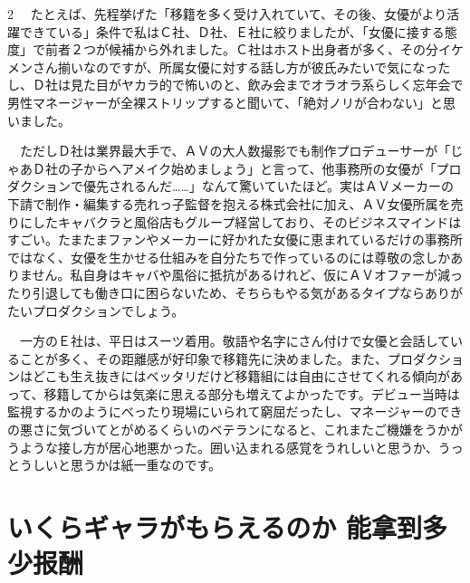\documentclass[12pt,UTF8]{ctexbook}
\begin{document}
\begin{paracol}{2}
　たとえば、先程挙げた「移籍を多く受け入れていて、その後、女優がより活躍できている」条件で私はＣ社、Ｄ社、Ｅ社に絞りましたが、「女優に接する態度」で前者２つが候補から外れました。Ｃ社はホスト出身者が多く、その分イケメンさん揃いなのですが、所属女優に対する話し方が彼氏みたいで気になったし、Ｄ社は見た目がヤカラ的で怖いのと、飲み会までオラオラ系らしく忘年会で男性マネージャーが全裸ストリップすると聞いて、「絶対ノリが合わない」と思いました。

　ただしＤ社は業界最大手で、ＡＶの大人数撮影でも制作プロデューサーが「じゃあＤ社の子からヘアメイク始めましょう」と言って、他事務所の女優が「プロダクションで優先されるんだ……」なんて驚いていたほど。実はＡＶメーカーの下請で制作・編集する売れっ子監督を抱える株式会社に加え、ＡＶ女優所属を売りにしたキャバクラと風俗店もグループ経営しており、そのビジネスマインドはすごい。たまたまファンやメーカーに好かれた女優に恵まれているだけの事務所ではなく、女優を生かせる仕組みを自分たちで作っているのには尊敬の念しかありません。私自身はキャバや風俗に抵抗があるけれど、仮にＡＶオファーが減ったり引退しても働き口に困らないため、そちらもやる気があるタイプならありがたいプロダクションでしょう。

　一方のＥ社は、平日はスーツ着用。敬語や名字にさん付けで女優と会話していることが多く、その距離感が好印象で移籍先に決めました。また、プロダクションはどこも生え抜きにはベッタリだけど移籍組には自由にさせてくれる傾向があって、移籍してからは気楽に思える部分も増えてよかったです。デビュー当時は監視するかのようにべったり現場にいられて窮屈だったし、マネージャーのできの悪さに気づいてとがめるくらいのベテランになると、これまたご機嫌をうかがうような接し方が居心地悪かった。囲い込まれる感覚をうれしいと思うか、うっとうしいと思うかは紙一重なのです。

\end{paracol}

\section{いくらギャラがもらえるのか
能拿到多少报酬}

\switchcolumn
\end{document}
